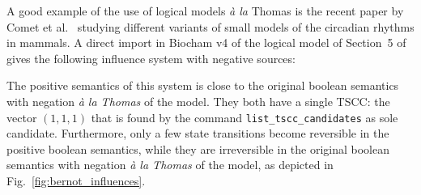 \documentclass{llncs}
\begin{document}
A good example of the use of logical models \emph{\`a la} Thomas is the recent
paper by Comet et al.~\cite{CBDDMC12pcs} studying different variants of small models of the
circadian rhythms in mammals.
A direct import in Biocham v4 of the logical model of Section~5 of~\cite{CBDDMC12pcs} gives
the following influence system with negative sources:


The positive semantics of this system is %
close to the original boolean semantics with negation \emph{\`a la Thomas} of the model. They both have a single TSCC: the vector $(1, 1, 1)$ that is found by 
the command \verb|list_tscc_candidates| 
as sole candidate.
Furthermore, only
a few state transitions become reversible in the positive boolean semantics, while they are
irreversible in the original boolean semantics with negation \emph{\`a la Thomas} of the model, as depicted in Fig.~\ref{fig:bernot_influences}.
\end{document}
